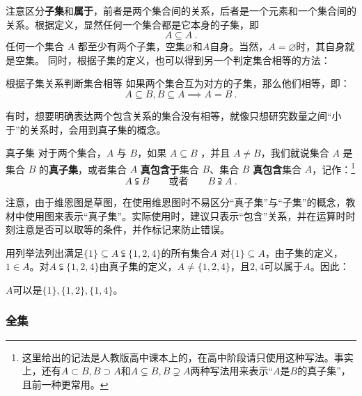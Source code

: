 注意区分\textbf{子集}和\textbf{属于}，前者是两个集合间的关系，后者是一个元素和一个集合间的关系。根据定义，显然任何一个集合都是它本身的子集，即
\begin{equation}
A \subseteq A~.
\end{equation}
任何一个集合 $A$ 都至少有两个子集，空集$\varnothing$和$A$自身。当然，$A=\varnothing$时，其自身就是空集。
同时，根据子集的定义，也可以得到另一个判定集合相等的方法：

\begin{theorem}{根据子集关系判断集合相等}
如果两个集合互为对方的子集，那么他们相等，即：
\begin{equation}\label{eq_HsSet_1}
A\subseteq B,B\subseteq A\implies A=B~.
\end{equation}
\end{theorem}

有时，想要明确表达两个包含关系的集合没有相等，就像只想研究数量之间“小于”的关系时，会用到真子集的概念。

\begin{definition}{真子集}
对于两个集合，$A$ 与 $B$，如果 $A\subseteq B$ ，并且 $A \ne B$，我们就说集合 $A$ 是集合 $B$ 的\textbf{真子集}，或者集合 $A$ \textbf{真包含于}集合 $B$、集合 $B$ \textbf{真包含}集合 $A$，记作：\footnote{这里给出的记法是人教版高中课本上的，在高中阶段请只使用这种写法。事实上，还有$A\subset B,B\supset A$和$A\subsetneq B,B\supsetneq A$两种写法用来表示“$A$是$B$的真子集”，且前一种更常用。}
\begin{equation}
A \subsetneqq B\qquad\text{或者}\qquad B \supsetneqq A~.
\end{equation}
\end{definition}

注意，由于维恩图是草图，在使用维恩图时不易区分“真子集”与“子集”的概念，教材中使用图来表示“真子集”。实际使用时，建议只表示“包含”关系，并在运算时时刻注意是否可以取等的条件，并作标记来防止错误。

\begin{exercise}{用列举法列出满足$\{1\}\subseteq A\subsetneqq\{1,2,4\}$的所有集合$A$}
对$\{1\}\subseteq A$，由子集的定义，$1\in A$。对$A\subsetneqq\{1,2,4\}$由真子集的定义，$A\neq \{1,2,4\}$，且$2,4$可以属于$A$。因此：

$A$可以是$\{1\},\{1,2\},\{1,4\}$。
\end{exercise}
\subsubsection{全集}

